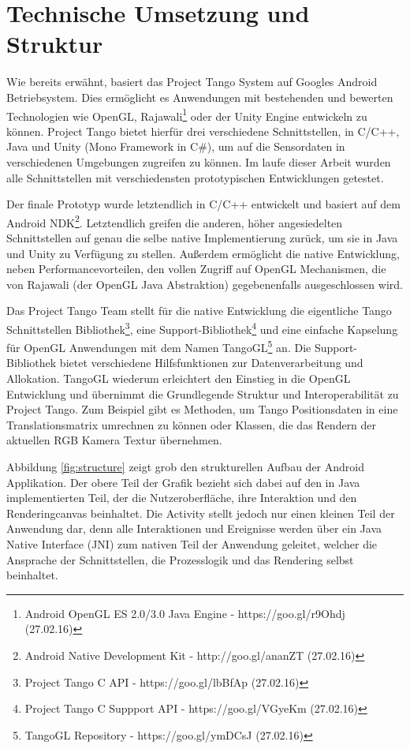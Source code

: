 \section{Technische Umsetzung und Struktur} \label{eq:technic}

Wie bereits erwähnt, basiert das Project Tango System auf Googles Android Betriebsystem. Dies ermöglicht es Anwendungen mit bestehenden und bewerten Technologien wie OpenGL, Rajawali\footnote{Android OpenGL ES 2.0/3.0 Java Engine - https://goo.gl/r9Ohdj (27.02.16)} oder der Unity Engine entwickeln zu können. Project Tango bietet hierfür drei verschiedene Schnittstellen, in C/C++, Java und Unity (Mono Framework in C\#), um auf die Sensordaten in verschiedenen Umgebungen zugreifen zu können. Im laufe dieser Arbeit wurden alle Schnittstellen mit verschiedensten prototypischen Entwicklungen getestet.

Der finale Prototyp wurde letztendlich in C/C++ entwickelt und basiert auf dem Android NDK\footnote{Android Native Development Kit - http://goo.gl/ananZT (27.02.16)}. Letztendlich greifen die anderen, höher angesiedelten Schnittstellen auf genau die selbe native Implementierung zurück, um sie in Java und Unity zu Verfügung zu stellen. Außerdem ermöglicht die native Entwicklung, neben Performancevorteilen, den vollen Zugriff auf OpenGL Mechanismen, die von Rajawali (der OpenGL Java Abstraktion) gegebenenfalls ausgeschlossen wird. 

Das Project Tango Team stellt für die native Entwicklung die eigentliche Tango Schnittstellen Bibliothek\footnote{Project Tango C API - https://goo.gl/lbBfAp (27.02.16)}, eine Support-Bibliothek\footnote{Project Tango C Suppport API - https://goo.gl/VGyeKm (27.02.16)} und eine einfache Kapselung für OpenGL Anwendungen mit dem Namen TangoGL\footnote{TangoGL Repository - https://goo.gl/ymDCsJ (27.02.16)} an. Die Support-Bibliothek bietet verschiedene Hilfsfunktionen zur Datenverarbeitung und Allokation. TangoGL wiederum erleichtert den Einstieg in die OpenGL Entwicklung und übernimmt die Grundlegende Struktur und Interoperabilität zu Project Tango. Zum Beispiel gibt es Methoden, um Tango Positionsdaten in eine Translationsmatrix umrechnen zu können oder Klassen, die das Rendern der aktuellen RGB Kamera Textur übernehmen. 

Abbildung \ref{fig:structure} zeigt grob den strukturellen Aufbau der Android Applikation. Der obere Teil der Grafik bezieht sich dabei auf den in Java implementierten Teil, der die Nutzeroberfläche, ihre Interaktion und den Renderingcanvas beinhaltet. Die Activity stellt jedoch nur einen kleinen Teil der Anwendung dar, denn alle Interaktionen und Ereignisse werden über ein Java Native Interface (JNI) zum nativen Teil der Anwendung geleitet, welcher die Ansprache der Schnittstellen, die Prozesslogik und das Rendering selbst beinhaltet. 

